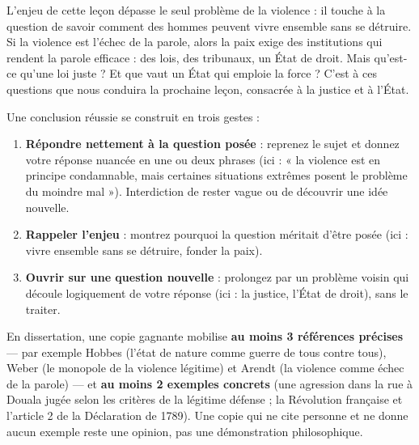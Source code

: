 \documentclass[11pt]{article}
\newcommand{\cle}[1]{{\popxbold\color{popdark}#1}}
\begin{document}
L'enjeu de cette leçon dépasse le seul problème de la violence : il touche à la question de savoir comment des hommes peuvent vivre ensemble sans se détruire. Si la violence est l'échec de la parole, alors la paix exige des institutions qui rendent la parole efficace : des lois, des tribunaux, un État de droit. Mais qu'est-ce qu'une loi juste ? Et que vaut un État qui emploie la force ? C'est à ces questions que nous conduira la prochaine leçon, consacrée à la \cle{justice} et à l'\cle{État}.

\begin{methode}
Une conclusion réussie se construit en trois gestes :
\begin{enumerate}
\item \textbf{Répondre nettement à la question posée} : reprenez le sujet et donnez votre réponse nuancée en une ou deux phrases (ici : « la violence est en principe condamnable, mais certaines situations extrêmes posent le problème du moindre mal »). Interdiction de rester vague ou de découvrir une idée nouvelle.
\item \textbf{Rappeler l'enjeu} : montrez pourquoi la question méritait d'être posée (ici : vivre ensemble sans se détruire, fonder la paix).
\item \textbf{Ouvrir sur une question nouvelle} : prolongez par un problème voisin qui découle logiquement de votre réponse (ici : la justice, l'État de droit), sans le traiter.
\end{enumerate}
\end{methode}

\begin{exemplebox}
En dissertation, une copie gagnante mobilise \textbf{au moins 3 références précises} — par exemple Hobbes (l'état de nature comme guerre de tous contre tous), Weber (le monopole de la violence légitime) et Arendt (la violence comme échec de la parole) — et \textbf{au moins 2 exemples concrets} (une agression dans la rue à Douala jugée selon les critères de la légitime défense ; la Révolution française et l'article 2 de la Déclaration de 1789). Une copie qui ne cite personne et ne donne aucun exemple reste une opinion, pas une démonstration philosophique.
\end{exemplebox}
\end{document}
